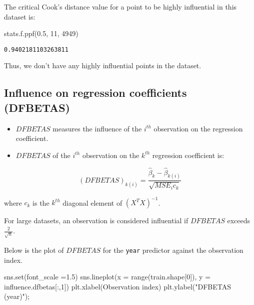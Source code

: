 \documentclass[
  letterpaper,
  DIV=11,
  numbers=noendperiod]{scrreprt}
\newenvironment{Shaded}{\begin{snugshade}}{\end{snugshade}}
\newcommand{\BuiltInTok}[1]{\textcolor[rgb]{0.00,0.23,0.31}{#1}}
\newcommand{\DecValTok}[1]{\textcolor[rgb]{0.68,0.00,0.00}{#1}}
\newcommand{\FloatTok}[1]{\textcolor[rgb]{0.68,0.00,0.00}{#1}}
\newcommand{\NormalTok}[1]{\textcolor[rgb]{0.00,0.23,0.31}{#1}}
\newcommand{\OperatorTok}[1]{\textcolor[rgb]{0.37,0.37,0.37}{#1}}
\newcommand{\StringTok}[1]{\textcolor[rgb]{0.13,0.47,0.30}{#1}}
\begin{document}
The critical Cook's distance value for a point to be highly influential
in this dataset is:

\begin{Shaded}
\begin{Highlighting}[]
\NormalTok{stats.f.ppf(}\FloatTok{0.5}\NormalTok{, }\DecValTok{11}\NormalTok{, }\DecValTok{4949}\NormalTok{)}
\end{Highlighting}
\end{Shaded}

\begin{verbatim}
0.9402181103263811
\end{verbatim}

Thus, we don't have any highly influential points in the dataset.

\subsection{Influence on regression coefficients
(DFBETAS)}\label{influence-on-regression-coefficients-dfbetas}

\begin{itemize}
\item
  \(DFBETAS\) measures the influence of the \(i^{th}\) observation on
  the regression coefficient.
\item
  \(DFBETAS\) of the \(i^{th}\) observation on the \(k^{th}\) regression
  coefficient is:
\end{itemize}

\begin{equation}
(DFBETAS)_{k(i)} = \frac{\hat{\beta}_k-\hat{\beta}_{k(i)}}{\sqrt{MSE_ic_{k}}}
\end{equation}

where \(c_k\) is the \(k^{th}\) diagonal element of \((X^TX)^{-1}\).

For large datasets, an observation is considered influential if
\(DFBETAS\) exceeds \(\frac{2}{\sqrt{n}}\).

Below is the plot of \(DFBETAS\) for the \texttt{year} predictor against
the observation index.

\begin{Shaded}
\begin{Highlighting}[]
\NormalTok{sns.}\BuiltInTok{set}\NormalTok{(font\_scale }\OperatorTok{=}\FloatTok{1.5}\NormalTok{)}
\NormalTok{sns.lineplot(x }\OperatorTok{=} \BuiltInTok{range}\NormalTok{(train.shape[}\DecValTok{0}\NormalTok{]), y }\OperatorTok{=}\NormalTok{ influence.dfbetas[:,}\DecValTok{1}\NormalTok{])}
\NormalTok{plt.xlabel(}\StringTok{\textquotesingle{}Observation index\textquotesingle{}}\NormalTok{)}
\NormalTok{plt.ylabel(}\StringTok{"DFBETAS (year)"}\NormalTok{)}\OperatorTok{;}
\end{Highlighting}
\end{Shaded}
\end{document}
